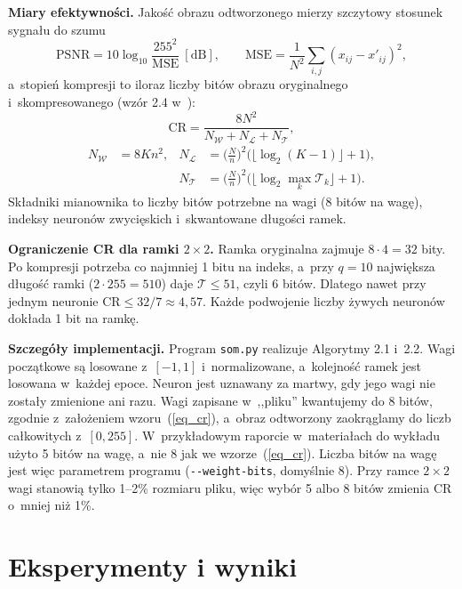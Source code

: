\documentclass[12pt]{article}
\begin{document}
\textbf{Miary efektywności.} Jakość obrazu odtworzonego mierzy szczytowy stosunek sygnału do szumu
\begin{equation}
 \mathrm{PSNR}=10\log_{10}\frac{255^2}{\mathrm{MSE}}\ \mathrm{[dB]},\qquad
 \mathrm{MSE}=\frac{1}{N^2}\sum_{i,j}(x_{ij}-x'_{ij})^2 ,
 \label{eq_psnr}
\end{equation}
a~stopień kompresji to iloraz liczby bitów obrazu oryginalnego i~skompresowanego (wzór 2.4
w~\cite{wyklad3}):
\begin{equation}
 \mathrm{CR}=\frac{8N^2}{N_{\mathcal{W}}+N_{\mathcal{L}}+N_{\mathcal{T}}},
 \label{eq_cr}
\end{equation}
\begin{align*}
 N_{\mathcal{W}}&=8Kn^2, &
 N_{\mathcal{L}}&=\Big(\frac{N}{n}\Big)^2\big(\lfloor\log_2(K-1)\rfloor+1\big),\\
 & &
 N_{\mathcal{T}}&=\Big(\frac{N}{n}\Big)^2\big(\lfloor\log_2\max_k\mathcal{T}_k\rfloor+1\big).
\end{align*}
Składniki mianownika to liczby bitów potrzebne na wagi (8 bitów na wagę), indeksy neuronów
zwycięskich i~skwantowane długości ramek.

\textbf{Ograniczenie CR dla ramki $2\times2$.} Ramka oryginalna zajmuje $8\cdot4=32$ bity. Po kompresji
potrzeba co najmniej 1 bitu na indeks, a~przy $q=10$ największa długość ramki ($2\cdot255=510$) daje
$\mathcal{T}\le51$, czyli 6 bitów. Dlatego nawet przy jednym neuronie
$\mathrm{CR}\le32/7\approx4{,}57$. Każde podwojenie liczby żywych neuronów dokłada 1 bit na ramkę.

\textbf{Szczegóły implementacji.} Program \texttt{som.py} realizuje Algorytmy 2.1 i~2.2.
Wagi początkowe są losowane z~$[-1,1]$ i~normalizowane, a~kolejność ramek jest losowana w~każdej
epoce. Neuron jest uznawany za martwy, gdy jego wagi nie zostały zmienione ani razu. Wagi zapisane
w~,,pliku'' kwantujemy do 8 bitów, zgodnie z~założeniem wzoru~(\ref{eq_cr}), a~obraz odtworzony
zaokrąglamy do liczb całkowitych z~$[0,255]$. W~przykładowym raporcie w~materiałach do wykładu
użyto 5 bitów na wagę, a~nie 8 jak we wzorze~(\ref{eq_cr}). Liczba bitów na wagę jest więc parametrem
programu (\texttt{-{}-weight-bits}, domyślnie 8). Przy ramce $2\times2$ wagi stanowią tylko 1--2\%
rozmiaru pliku, więc wybór 5 albo 8 bitów zmienia CR o~mniej niż 1\%.

\section{Eksperymenty i wyniki}
\end{document}
